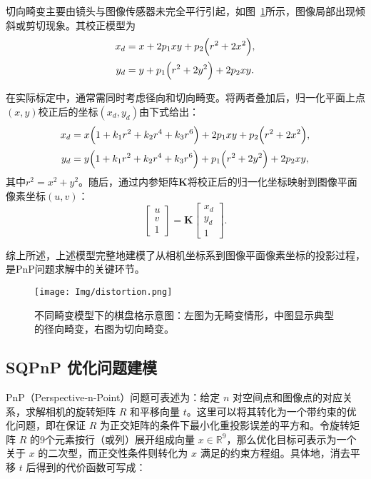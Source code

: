 切向畸变主要由镜头与图像传感器未完全平行引起，如图~\ref{fig:distortion_patterns}所示，图像局部出现倾斜或剪切现象。其校正模型为
\begin{equation}
	\begin{aligned}
		x_{d} &= x + 2p_1 xy + p_2\Bigl(r^2 + 2x^2\Bigr),\\[2pt]
		y_{d} &= y + p_1\Bigl(r^2 + 2y^2\Bigr) + 2p_2 xy.
	\end{aligned}
\end{equation}

在实际标定中，通常需同时考虑径向和切向畸变。将两者叠加后，归一化平面上点$(x,y)$校正后的坐标$(x_d,y_d)$由下式给出：
\begin{equation}
	\begin{aligned}
		x_{d} &= x\Bigl(1 + k_1r^2 + k_2r^4 + k_3r^6\Bigr)
		+ 2p_1 xy + p_2\Bigl(r^2 + 2x^2\Bigr),\\[2pt]
		y_{d} &= y\Bigl(1 + k_1r^2 + k_2r^4 + k_3r^6\Bigr)
		+ p_1\Bigl(r^2 + 2y^2\Bigr) + 2p_2 xy,
	\end{aligned}
	\label{eq:comprehensive_distortion}
\end{equation}
其中$r^2=x^2+y^2$。随后，通过内参矩阵$\mathbf{K}$将校正后的归一化坐标映射到图像平面像素坐标$(u,v)$：
\begin{equation}
	\begin{bmatrix}
		u \\[2pt]
		v \\[2pt]
		1
	\end{bmatrix}
	=
	\mathbf{K}
	\begin{bmatrix}
		x_d \\[2pt]
		y_d \\[2pt]
		1
	\end{bmatrix}.
\end{equation}

综上所述，上述模型完整地建模了从相机坐标系到图像平面像素坐标的投影过程，是PnP问题求解中的关键环节。

\begin{figure}[htbp]
	\centering
	\texttt{[image: Img/distortion.png]}
	\caption{不同畸变模型下的棋盘格示意图：左图为无畸变情形，中图显示典型的径向畸变，右图为切向畸变。}
	\label{fig:distortion_patterns}
\end{figure}

\subsection{SQPnP 优化问题建模}
PnP（Perspective-n-Point）问题可表述为：给定 $n$ 对空间点和图像点的对应关系，求解相机的旋转矩阵 $R$ 和平移向量 $t$。这里可以将其转化为一个带约束的优化问题，即在保证 $R$ 为正交矩阵的条件下最小化重投影误差的平方和。令旋转矩阵 $R$ 的9个元素按行（或列）展开组成向量 $x \in \mathbb{R}^9$，那么优化目标可表示为一个关于 $x$ 的二次型，而正交性条件则转化为 $x$ 满足的约束方程组。具体地，消去平移 $t$ 后得到的代价函数可写成：

